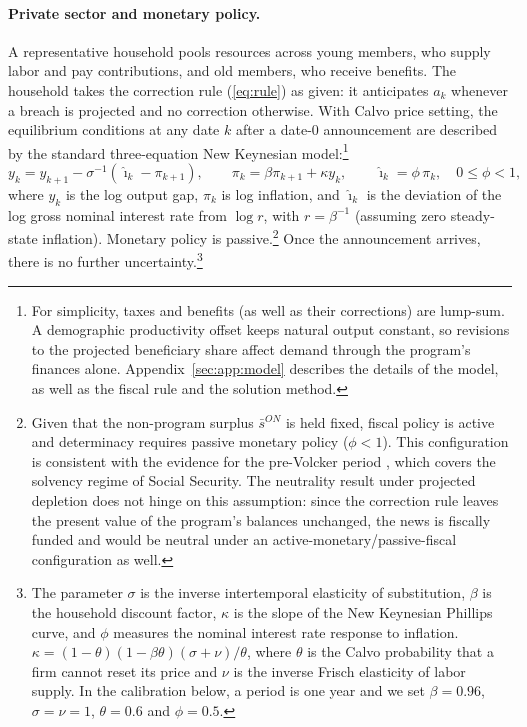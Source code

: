 \documentclass[12pt]{article}%
\theoremstyle{remark}
\begin{document}
\paragraph{Private sector and monetary policy.}
A representative household pools resources across young members, who supply labor and pay contributions, and old members, who receive benefits. The household takes the correction rule (\ref{eq:rule}) as given: it anticipates $a_k$ whenever a breach is projected and no correction otherwise. With Calvo price setting, the equilibrium conditions at any date $k$ after a date-0 announcement are described by the standard three-equation New Keynesian model:\footnote{For simplicity, taxes and benefits (as well as their corrections) are lump-sum. A demographic productivity offset keeps natural output constant, so revisions to the projected beneficiary share affect demand through the program's finances alone. Appendix~\ref{sec:app:model} describes the details of the model, as well as the fiscal rule and the solution method.}
\begin{equation}\label{eq:nk}
y_k = y_{k+1} - \sigma^{-1}\left(\hat\imath_k - \pi_{k+1}\right),
\qquad
\pi_k = \beta\pi_{k+1} + \kappa y_k,
\qquad
\hat\imath_k = \phi\,\pi_k,
\quad 0\leq\phi<1,
\end{equation}
where $y_k$ is the log output gap, $\pi_k$ is log inflation, and $\hat\imath_k$
is the deviation of the log gross nominal interest rate from $\log r$, with
$r=\beta^{-1}$ (assuming zero steady-state inflation). Monetary policy is
passive.\footnote{Given that the non-program surplus $\bar s^{ON}$ is held fixed, fiscal policy is active and determinacy requires passive monetary policy ($\phi<1$). This configuration is consistent with the evidence for the pre-Volcker period \citep[e.g.,][]{CGG00, DavigLeeper2007,Bianchi2012}, which covers the solvency regime of Social Security. The neutrality result under projected depletion does not hinge on this assumption: since the correction rule leaves the present value of the program's balances unchanged, the news is fiscally funded and would be neutral under an active-monetary/passive-fiscal configuration as well.}
Once the announcement arrives, there is no further uncertainty.\footnote{The parameter $\sigma$ is the inverse intertemporal elasticity of substitution, $\beta$ is the household discount factor, $\kappa$ is the slope of the New Keynesian Phillips curve, and $\phi$ measures the nominal interest rate response to inflation. $\kappa=(1-\theta)(1-\beta\theta)(\sigma+\nu)/\theta$, where $\theta$ is the Calvo probability that a firm cannot reset its price and $\nu$ is the inverse Frisch elasticity of labor supply. In the calibration below, a period is one year and we set $\beta=0.96$, $\sigma=\nu=1$, $\theta=0.6$ and $\phi=0.5$.}
\end{document}
